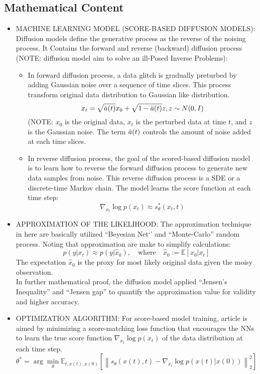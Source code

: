\documentclass{article}
\begin{document}
\subsection*{Mathematical Content}
\begin{itemize}
    \item MACHINE LEARNING MODEL (SCORE-BASED DIFFUSION MODELS):
    Diffusion models define the generative process as the reverse of the noising process. It Contains the forward and reverse (backward) diffusion process (NOTE: diffusion model aim to solve an ill-Posed Inverse Problems):
    \begin{itemize}
        \item In forward diffusion process, a data glitch is gradually preturbed by adding Gaussian noise over a sequence of time slices. This process transform original data distribution to Gaussian like distribution.
        \[ x_t = \sqrt{\Bar{a}(t)}x_0 + \sqrt{1 - \Bar{a}(t)}z, z \sim N(0, I) \]
        (NOTE: $x_0$ is the original data, $x_t$ is the perturbed data at time $t$, and $z$ is the Gaussian noise. The term $\Bar{a}(t)$ controls the amount of noise added at each time slices.
        \item In reverse diffusion process, the goal of the scored-based diffusion model is to learn how to reverse the forward diffusion process to generate new data samples from noise. This reverse diffusion process is a SDE or a discrete-time Markov chain. The model learns the score function at each time step:
        \[ \nabla_{x_t} \log p(x_t) \approx s_{\theta}^*(x_t, t) \]
    \end{itemize}
    \item APPROXIMATION OF THE LIKELIHOOD:
    The approximation technique in here are basically utilized ``Beyesian Net‘’ and ``Monte-Carlo'' random process. Noting that approximation are make to simplify calculations:
    \[ p(y|x_t) \approx p(y|\hat{x}_0), \quad \text{where} \quad \hat{x}_0 := \mathbb{E}[x_0 | x_t] \]
    The expectation $\hat{x}_0$ is the proxy for most likely original data given the moisy observation. 
    \\
    In further mathematical proof, the diffusion model applied ``Jensen's Inequality'' and ``Jensen gap'' to quantify the approximation value for validity and higher accuracy.
    \item OPTIMIZATION ALGORITHM:
    For score-based model training, article is aimed by minimizing a score-matching loss function that encourages the NNs to learn the true score function \( \nabla_{x_t} \log p(x_t) \) of the data distribution at each time step. 
    \\
    \[ \theta^* = \arg\min_{\theta} \mathbb{E}_{t, x(t), x(0)} \left[ \left\| s_{\theta}(x(t), t) - \nabla_{x_t} \log p(x(t) | x(0)) \right\|_2^2 \right] \]
\end{itemize}
\end{document}
